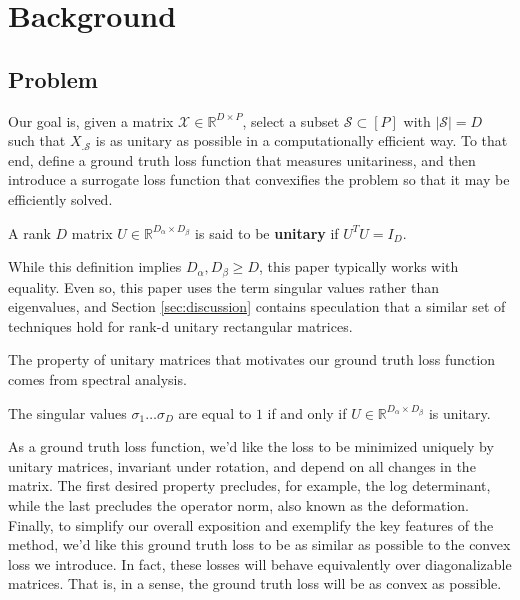 \section{Background}

\subsection{Problem}

Our goal is, given a matrix $\mathcal X \in \mathbb R^{D \times P}$, select a subset $\mathcal S \subset [P]$ with $|\mathcal S| = D$ such that $X_{. \mathcal S}$ is as unitary as possible in a computationally efficient way.
To that end, define a ground truth loss function that measures unitariness, and then introduce a surrogate loss function that convexifies the problem so that it may be efficiently solved.

\begin{definition}[Unitary]
A rank $D$ matrix $U \in \mathbb R^{D_\alpha \times D_\beta}$ is said to be \textbf{unitary} if $U^TU = I_D$.
\end{definition}

While this definition implies $D_\alpha, D_\beta \geq D$, this paper typically works with equality.
Even so, this paper uses the term singular values rather than eigenvalues, and Section \ref{sec:discussion} contains speculation that a similar set of techniques hold for rank-d unitary rectangular matrices.

The property of unitary matrices that motivates our ground truth loss function comes from spectral analysis.
\begin{proposition}
\label{prop:unitary_spectrum}
The singular values $\sigma_1 \dots \sigma_D$ are equal to $1$ if and only if $U \in \mathbb{R}^{D_\alpha \times D_\beta}$ is unitary.
\end{proposition}

As a ground truth loss function, we'd like the loss to be minimized uniquely by unitary matrices, invariant under rotation, and depend on all changes in the matrix.
The first desired property precludes, for example, the log determinant, while the last precludes the operator norm, also known as the deformation. %
Finally, to simplify our overall exposition and exemplify the key features of the method, we'd like this ground truth loss to be as similar as possible to the convex loss we introduce.
In fact, these losses will behave equivalently over diagonalizable matrices.
That is, in a sense, the ground truth loss will be as convex as possible.

